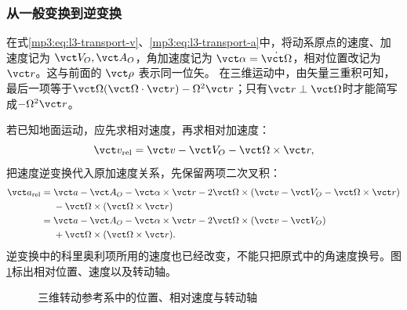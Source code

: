 \documentclass[11pt,openany,fontset=fandol]{ctexbook}
\theoremstyle{definition}\newtheorem{example}{例}[chapter]\newtheorem{exercise}{习题}[chapter]
\begin{document}
\subsubsection{从一般变换到逆变换}
在式\eqref{mp3:eq:l3-transport-v}、\eqref{mp3:eq:l3-transport-a}中，将动系原点的速度、加速度记为 $\vct V_O,\vct A_O$，角加速度记为 $\vct\alpha=\dot{\vct\Omega}$，相对位置改记为 $\vct r$。这与前面的 $\vct\rho$ 表示同一位矢。
在三维运动中，由矢量三重积可知，最后一项等于$\vct\Omega(\vct\Omega\cdot\vct r)-\Omega^2\vct r$；只有$\vct r\perp\vct\Omega$时才能简写成$-\Omega^2\vct r$。

若已知地面运动，应先求相对速度，再求相对加速度：
\[
 \vct v_{\rm rel}=\vct v-\vct V_O-\vct\Omega\times\vct r,
\]
把速度逆变换代入原加速度关系，先保留两项二次叉积：
\[
\begin{aligned}
\vct a_{\rm rel}={}&\vct a-\vct A_O-\vct\alpha\times\vct r
-2\vct\Omega\times(\vct v-\vct V_O-\vct\Omega\times\vct r)\\
&-\vct\Omega\times(\vct\Omega\times\vct r)\\
={}&\vct a-\vct A_O-\vct\alpha\times\vct r
-2\vct\Omega\times(\vct v-\vct V_O)\\
&+\vct\Omega\times(\vct\Omega\times\vct r).
\end{aligned}
\]
逆变换中的科里奥利项所用的速度也已经改变，不能只把原式中的角速度换号。图\ref{mp3:fig:hw:transport}标出相对位置、速度以及转动轴。

\begin{figure}[H]\centering
{}
\caption{三维转动参考系中的位置、相对速度与转动轴}\label{mp3:fig:hw:transport}
\end{figure}
\end{document}
